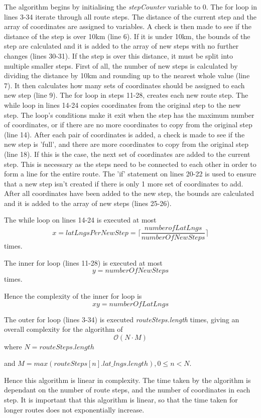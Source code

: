 \documentclass[authoryearcitations]{UoYCSproject}
\begin{document}
The algorithm begins by initialising the \textit{stepCounter} variable to 0. The for loop in lines 3-34 iterate through all route steps. The distance of the current step and the array of coordinates are assigned to variables. A check is then made to see if the distance of the step is over 10km (line 6). If it is under 10km, the bounds of the step are calculated and it is added to the array of new steps with no further changes (lines 30-31). If the step is over this distance, it must be split into multiple smaller steps. First of all, the number of new steps is calculated by dividing the distance by 10km and rounding up to the nearest whole value (line 7). It then calculates how many sets of coordinates should be assigned to each new step (line 9). The for loop in steps 11-28, creates each new route step. The while loop in lines 14-24 copies coordinates from the original step to the new step. The loop's conditions make it exit when the step has the maximum number of coordinates, or if there are no more coordinates to copy from the original step (line 14). After each pair of coordinates is added, a check is made to see if the new step is 'full', and there are more coordinates to copy from the original step (line 18). If this is the case, the next set of coordinates are added to the current step. This is necessary as the steps need to be connected to each other in order to form a line for the entire route. The 'if' statement on lines 20-22 is used to ensure that a new step isn't created if there is only 1 more set of coordinates to add. After all coordinates have been added to the new step, the bounds are calculated and it is added to the array of new steps (lines 25-26).

The while loop on lines 14-24 is executed at most
$$x = latLngsPerNewStep = \lceil \frac{numberofLatLngs}{numberOfNewSteps}\rceil$$ 
times. 

The inner for loop (lines 11-28) is executed at most 
$$y = numberOfNewSteps$$ 
times. 

Hence the complexity of the inner for loop is
$$xy = numberOfLatLngs$$

The outer for loop (lines 3-34) is executed \textit{routeSteps.length} times, giving an overall complexity for the algorithm of
$$\mathcal{O}(N \cdot M)$$
where $N = routeSteps.length$ 

and $M = max(routeSteps[n].lat\_lngs.length), 0\leq n<N$.

Hence this algorithm is linear in complexity. The time taken by the algorithm is dependant on the number of route steps, and the number of coordinates in each step. It is important that this algorithm is linear, so that the time taken for longer routes does not exponentially increase.
\end{document}
